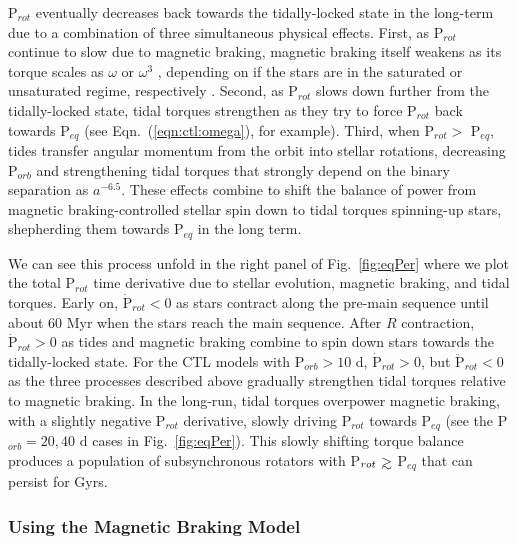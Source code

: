 \documentclass[twocolumn]{aastex61}
\def\gsim{~\rlap{$>$}{\lower 1.0ex\hbox{$\sim$}}}
\begin{document}
P$_{rot}$ eventually decreases back towards the tidally-locked state in the long-term due to a combination of three simultaneous physical effects.  First, as P$_{rot}$ continue to slow due to magnetic braking, magnetic braking itself weakens as its torque scales as $\omega$ or $\omega^3$ \citep{Kawaler1988}, depending on if the stars are in the saturated or unsaturated regime, respectively \citep{Matt2015}.  Second, as P$_{rot}$ slows down further from the tidally-locked state, tidal torques strengthen as they try to force P$_{rot}$ back towards P$_{eq}$ (see Eqn.~(\ref{eqn:ctl:omega}), for example). Third, when P$_{rot} > $ P$_{eq}$, tides transfer angular momentum from the orbit into stellar rotations, decreasing P$_{orb}$ and strengthening tidal torques that strongly depend on the binary separation as $a^{-6.5}$.  These effects combine to shift the balance of power from magnetic braking-controlled stellar spin down to tidal torques spinning-up stars, shepherding them towards P$_{eq}$ in the long term. 

We can see this process unfold in the right panel of Fig.~\ref{fig:eqPer} where we plot the total P$_{rot}$ time derivative due to stellar evolution, magnetic braking, and tidal torques. Early on, $\dot{\mathrm{P}}_{rot} < 0$ as stars contract along the pre-main sequence until about 60 Myr when the stars reach the main sequence. After $R$ contraction, $\dot{\mathrm{P}}_{rot} > 0$ as tides and magnetic braking combine to spin down stars towards the tidally-locked state. For the CTL models with P$_{orb} > 10$ d, $\dot{\mathrm{P}}_{rot} > 0$, but $\ddot{\mathrm{P}}_{rot} < 0$ as the three processes described above gradually strengthen tidal torques relative to magnetic braking.  In the long-run, tidal torques overpower magnetic braking, with a slightly negative P$_{rot}$ derivative, slowly driving P$_{rot}$ towards P$_{eq}$ (see the P$_{orb} = 20, 40$ d cases in Fig.~\ref{fig:eqPer}). This slowly shifting torque balance produces a population of subsynchronous rotators with P$_{rot} \gsim $ P$_{eq}$ that can persist for Gyrs.  

\subsubsection{Using the \citet{Reiners2012} Magnetic Braking Model}
\end{document}
